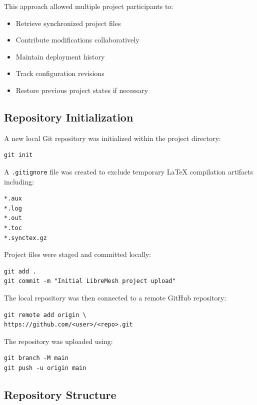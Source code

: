 \documentclass[conference]{IEEEtran}
\begin{document}
This approach allowed multiple project participants to:

\begin{itemize}
    \item Retrieve synchronized project files
    \item Contribute modifications collaboratively
    \item Maintain deployment history
    \item Track configuration revisions
    \item Restore previous project states if necessary
\end{itemize}

\subsection{Repository Initialization}

A new local Git repository was initialized within the project directory:

\begin{lstlisting}
git init
\end{lstlisting}

A \texttt{.gitignore} file was created to exclude temporary LaTeX compilation artifacts including:

\begin{lstlisting}
*.aux
*.log
*.out
*.toc
*.synctex.gz
\end{lstlisting}

Project files were staged and committed locally:

\begin{lstlisting}
git add .
git commit -m "Initial LibreMesh project upload"
\end{lstlisting}

The local repository was then connected to a remote GitHub repository:

\begin{lstlisting}
git remote add origin \
https://github.com/<user>/<repo>.git
\end{lstlisting}

The repository was uploaded using:

\begin{lstlisting}
git branch -M main
git push -u origin main
\end{lstlisting}

\subsection{Repository Structure}
\end{document}
